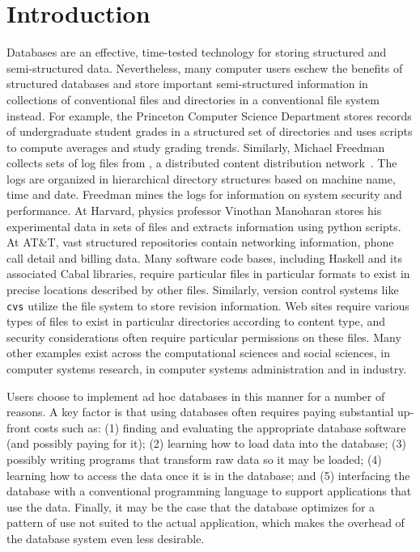 \section {Introduction}
\label{sec:intro}

Databases are an effective, time-tested technology for storing
structured and semi-structured data.  Nevertheless, many computer
users eschew the benefits of structured databases and store important
semi-structured information in collections of conventional files
and directories in a conventional file system instead.  For example, the
Princeton Computer Science Department
stores records of undergraduate student grades in a structured set of
directories and uses scripts to compute averages and
study grading trends.  Similarly, Michael Freedman collects
sets of log files from \coral, a distributed content distribution
network~\cite{freedman+:coral,freedman:coral-experience}.  
The logs are organized in hierarchical
directory structures based on machine name, time and date.  Freedman
mines the logs for information on system security and performance.  At
Harvard, physics professor Vinothan Manoharan stores 
his experimental data in sets of files and
extracts information using python scripts.  At AT\&T, vast structured
repositories contain networking information,
phone call detail and billing data.  
Many software code bases, including Haskell and its associated Cabal libraries,
require particular files in particular formats to exist in precise
locations described by other files. 
Similarly, version control systems like \texttt{cvs} utilize the file
system to store revision information. Web sites require various types
of files to exist in particular directories according to content type,
and security considerations often require particular permissions on
these files.
Many other examples exist across the computational sciences and social
sciences, in computer systems research, in computer
systems administration and in industry.

Users choose to implement ad hoc databases in this manner for a number
of reasons. A key factor is  that using
databases often requires paying substantial up-front costs such as:
(1) finding and evaluating the appropriate database software (and
possibly paying for it); (2) learning how to load data into the
database; (3) possibly writing programs that transform raw data 
so it may be loaded; (4) learning how
to access the data once it is in the database; and (5) interfacing the
database with a conventional programming language to support
applications that use the data.  Finally, it may be the case that the
database optimizes for a pattern of use not suited to the actual
application, which makes the overhead of the database system even
less desirable. 

